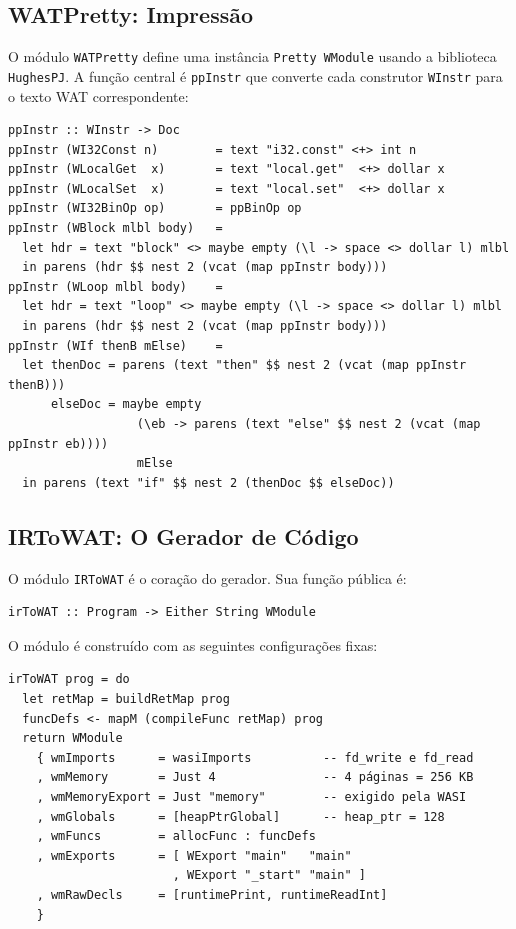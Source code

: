 \subsection{WATPretty: Impressão}

O módulo \texttt{WATPretty} define uma instância \texttt{Pretty WModule}
usando a biblioteca \texttt{HughesPJ}.  A função central é \texttt{ppInstr}
que converte cada construtor \texttt{WInstr} para o texto WAT correspondente:

\begin{verbatim}
ppInstr :: WInstr -> Doc
ppInstr (WI32Const n)        = text "i32.const" <+> int n
ppInstr (WLocalGet  x)       = text "local.get"  <+> dollar x
ppInstr (WLocalSet  x)       = text "local.set"  <+> dollar x
ppInstr (WI32BinOp op)       = ppBinOp op
ppInstr (WBlock mlbl body)   =
  let hdr = text "block" <> maybe empty (\l -> space <> dollar l) mlbl
  in parens (hdr $$ nest 2 (vcat (map ppInstr body)))
ppInstr (WLoop mlbl body)    =
  let hdr = text "loop" <> maybe empty (\l -> space <> dollar l) mlbl
  in parens (hdr $$ nest 2 (vcat (map ppInstr body)))
ppInstr (WIf thenB mElse)    =
  let thenDoc = parens (text "then" $$ nest 2 (vcat (map ppInstr thenB)))
      elseDoc = maybe empty
                  (\eb -> parens (text "else" $$ nest 2 (vcat (map ppInstr eb))))
                  mElse
  in parens (text "if" $$ nest 2 (thenDoc $$ elseDoc))
\end{verbatim}

\subsection{IRToWAT: O Gerador de Código}

O módulo \texttt{IRToWAT} é o coração do gerador.  Sua função pública é:

\begin{verbatim}
irToWAT :: Program -> Either String WModule
\end{verbatim}

O módulo é construído com as seguintes configurações fixas:

\begin{verbatim}
irToWAT prog = do
  let retMap = buildRetMap prog
  funcDefs <- mapM (compileFunc retMap) prog
  return WModule
    { wmImports      = wasiImports          -- fd_write e fd_read
    , wmMemory       = Just 4               -- 4 páginas = 256 KB
    , wmMemoryExport = Just "memory"        -- exigido pela WASI
    , wmGlobals      = [heapPtrGlobal]      -- heap_ptr = 128
    , wmFuncs        = allocFunc : funcDefs
    , wmExports      = [ WExport "main"   "main"
                       , WExport "_start" "main" ]
    , wmRawDecls     = [runtimePrint, runtimeReadInt]
    }
\end{verbatim}

